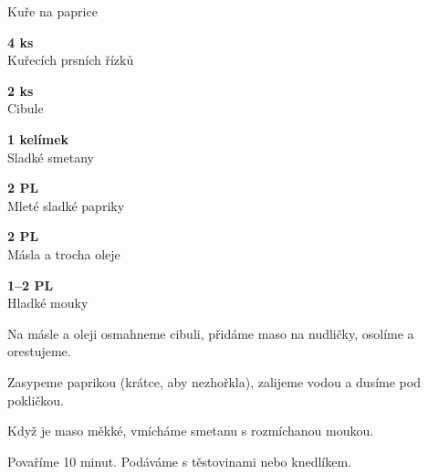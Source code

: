 \documentclass[11pt,a4paper]{article}
\begin{document}
\begin{recipe}[BurntOrange]{Kuře na paprice}
    \begin{ingredients}
        \item \parbox[t]{\linewidth}{\raggedright \piece \textbf{4 ks}\\ Kuřecích prsních řízků}
        \item \parbox[t]{\linewidth}{\raggedright \piece \textbf{2 ks}\\ Cibule}
        \item \parbox[t]{\linewidth}{\raggedright \liquid \textbf{1 kelímek}\\ Sladké smetany}
        \item \parbox[t]{\linewidth}{\raggedright \spoon \textbf{2 PL}\\ Mleté sladké papriky}
        \item \parbox[t]{\linewidth}{\raggedright \spoon \textbf{2 PL}\\ Másla a trocha oleje}
        \item \parbox[t]{\linewidth}{\raggedright \spoon \textbf{1--2 PL}\\ Hladké mouky}
    \end{ingredients}
    \begin{steps}
        \item Na másle a oleji osmahneme cibuli, přidáme maso na nudličky, osolíme a orestujeme.
        \item Zasypeme paprikou (krátce, aby nezhořkla), zalijeme vodou a dusíme pod pokličkou.
        \item Když je maso měkké, vmícháme smetanu s rozmíchanou moukou.
        \item Povaříme 10 minut. Podáváme s těstovinami nebo knedlíkem.
    \end{steps}
\end{recipe}
\end{document}
